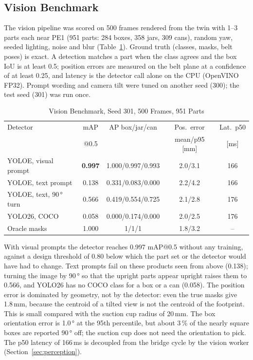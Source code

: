 \subsection{Vision Benchmark}

The vision pipeline was scored on 500 frames rendered from the twin with 1--3 parts each near
PE1 (951 parts: 284 boxes, 358 jars, 309 cans), random yaw, seeded lighting, noise and blur
(Table~\ref{tab:vision}). Ground truth (classes, masks, belt poses) is exact. A detection
matches a part when the class agrees and the box IoU is at least 0.5; position errors are
measured on the belt plane at a confidence of at least 0.25, and latency is the detector call
alone on the CPU (OpenVINO FP32). Prompt wording and camera tilt were tuned on another seed (300);
the test seed (301) was run once.

\begin{table}[t]
\caption{Vision Benchmark, Seed 301, 500 Frames, 951 Parts}
\label{tab:vision}
\centering
\footnotesize
\setlength{\tabcolsep}{2pt}
\begin{tabular}{@{}lcccc@{}}
\toprule
Detector & mAP & AP box/jar/can & Pos.\ error & Lat.\ p50 \\
 & @0.5 & & mean/p95 [mm] & [ms] \\
\midrule
YOLOE, visual prompt & \textbf{0.997} & 1.000/0.997/0.993 & 2.0/3.1 & 166 \\
YOLOE, text prompt & 0.138 & 0.331/0.083/0.000 & 2.2/4.2 & 166 \\
YOLOE, text, 90\,° turn & 0.566 & 0.419/0.554/0.725 & 2.1/2.8 & 176 \\
YOLO26, COCO & 0.058 & 0.000/0.174/0.000 & 2.0/2.5 & 176 \\
Oracle masks & 1.000 & 1/1/1 & 1.8/3.2 & -- \\
\bottomrule
\end{tabular}
\end{table}

With visual prompts the detector reaches 0.997 mAP@0.5 without any training, against a design
threshold of 0.80 below which the part set or the detector would have had to change. Text
prompts fail on these products seen from above (0.138); turning the image by 90\,° so that the
upright parts appear upright raises them to 0.566, and YOLO26 has no COCO class for a box or a
can (0.058). The position error is dominated by geometry, not by the detector: even the true
masks give 1.8\,mm, because the centroid of a tilted view is not the centroid of the footprint.
This is small compared with the suction cup radius of 20\,mm. The box orientation error is
1.0\,° at the 95th percentile, but about 3\,\% of the nearly square boxes are reported 90\,° off;
the suction cup does not need the orientation to pick. The p50 latency of 166\,ms is decoupled
from the bridge cycle by the vision worker (Section~\ref{sec:perception}).

